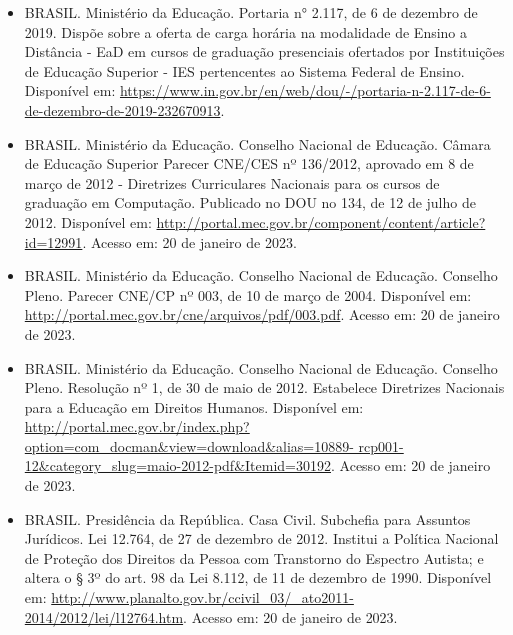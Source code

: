 \begin{itemize}
  \item BRASIL. Ministério da Educação. Portaria n° 2.117, de 6 de
    dezembro de 2019.  Dispõe sobre a oferta de carga horária na
    modalidade de Ensino a Distância - EaD em cursos de graduação
    presenciais ofertados por Instituições de Educação Superior - IES
    pertencentes ao Sistema Federal de Ensino.  Disponível em:
    \url{https://www.in.gov.br/en/web/dou/-/portaria-n-2.117-de-6-de-dezembro-de-2019-232670913}.
    
    \item BRASIL. Ministério da Educação. Conselho Nacional de Educação. Câmara
    de Educação Superior Parecer CNE/CES nº 136/2012, aprovado em 8 de março de
    2012 - Diretrizes Curriculares Nacionais para os cursos de graduação em
    Computação. 
    Publicado no DOU no 134, de 12 de julho de 2012.
    Disponível em: \url{http://portal.mec.gov.br/component/content/article?id=12991}.
    Acesso em: 20 de janeiro de 2023.
    
    \item BRASIL. Ministério da Educação. Conselho Nacional de Educação.
    Conselho Pleno. Parecer CNE/CP nº 003, de 10 de março de 2004.
    Disponível em: \url{http://portal.mec.gov.br/cne/arquivos/pdf/003.pdf}. 
    Acesso em: 20 de janeiro de 2023.
    
    \item BRASIL. Ministério da Educação. Conselho Nacional de Educação.
    Conselho Pleno. Resolução nº 1, de 30 de maio de 2012. Estabelece
    Diretrizes Nacionais para a Educação em Direitos Humanos. 
    Disponível em: \url{http://portal.mec.gov.br/index.php?option=com_docman&view=download&alias=10889-
    rcp001-12&category_slug=maio-2012-pdf&Itemid=30192}. 
    Acesso em: 20 de janeiro de 2023.
    
    \item BRASIL. Presidência da República. Casa Civil. Subchefia para Assuntos
    Jurídicos. Lei 12.764, de 27 de dezembro de 2012. Institui a Política
    Nacional de Proteção dos Direitos da Pessoa com Transtorno do Espectro
    Autista; e altera o § 3º do art. 98 da Lei 8.112, de 11 de dezembro de
    1990. 
    Disponível em: \url{http://www.planalto.gov.br/ccivil_03/_ato2011-2014/2012/lei/l12764.htm}.
    Acesso em: 20 de janeiro de 2023.
    

\end{itemize}
